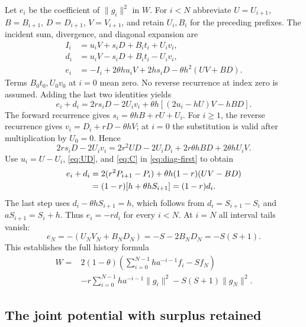 \documentclass[11pt]{article}
\numberwithin{equation}{section}
\theoremstyle{remark}
\newcommand{\norm}[1]{\lVert #1\rVert}
\begin{document}
Let $e_i$ be the coefficient of $\norm{g_i}^2$ in $W$.
For $i<N$ abbreviate $U=U_{i+1}$, $B=B_{i+1}$, $D=D_{i+1}$,
$V=V_{i+1}$, and retain $U_i,B_i$ for the preceding prefixes.
The incident sum, divergence, and diagonal expansion are
\begin{align}
I_i&=u_iV+s_iD+B_it_i+U_iv_i,\label{eq:diag-I}\\
d_i&=u_iV-s_iD+B_it_i-U_iv_i,\label{eq:diag-d}\\
e_i&=-I_i+2\theta h u_iV+2h s_iD
       -\theta h^2(UV+BD).\label{eq:diag-e}
\end{align}
Terms $B_0t_0,U_0v_0$ at $i=0$ mean zero. No reverse recurrence
at index zero is assumed. Adding the last two identities yields
\begin{equation}
e_i+d_i
=2r s_iD-2U_iv_i
 +\theta h[(2u_i-hU)V-hBD].
\label{eq:diag-first}
\end{equation}
The forward recurrence gives $s_i=\theta hB+rU+U_i$.
For $i\geq1$, the reverse recurrence gives
$v_i=D_i+rD-\theta hV$; at $i=0$ the substitution is valid after
multiplication by $U_0=0$. Hence
\[
2rs_iD-2U_iv_i
=2r^2UD-2U_iD_i+2r\theta hBD+2\theta hU_iV.
\]
Use $u_i=U-U_i$, \eqref{eq:UD}, and \eqref{eq:C} in
\eqref{eq:diag-first} to obtain
\begin{align}
e_i+d_i
&=2(r^2P_{i+1}-P_i)+\theta h(1-r)(UV-BD)\notag\\
&=(1-r)[h+\theta hS_{i+1}]=(1-r)d_i.
\label{eq:diag-final}
\end{align}
The last step uses $d_i-\theta hS_{i+1}=h$, which follows from
$d_i=S_{i+1}-S_i$ and $aS_{i+1}=S_i+h$.
Thus $e_i=-rd_i$ for every $i<N$. At $i=N$ all interval tails vanish:
\begin{equation}
e_N=-(U_NV_N+B_ND_N)
=-S-2B_ND_N=-S(S+1).
\label{eq:diag-terminal}
\end{equation}
This establishes the full history formula
\begin{equation}
\begin{split}
W={}&2(1-\theta)
 \left(\sum_{i=0}^{N-1}ha^{-i-1}f_i-Sf_N\right)\\
&-r\sum_{i=0}^{N-1}ha^{-i-1}\norm{g_i}^2
 -S(S+1)\norm{g_N}^2.
\end{split}
\label{eq:history-formula}
\end{equation}

\subsection{The joint potential with surplus retained}
\end{document}
